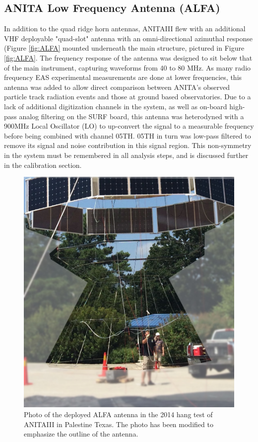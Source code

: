 	
	
	\subsection{ANITA Low Frequency Antenna (ALFA)}
		In addition to the quad ridge horn antennas, ANITAIII flew with an additional VHF deployable "quad-slot" antenna with an omni-directional azimuthal response (Figure \ref{fig:ALFA} mounted underneath the main structure, pictured in Figure \ref{fig:ALFA}.  The frequency response of the antenna was designed to sit below that of the main instrument, capturing waveforms from 40 to 80 MHz.  As many radio frequency EAS experimental measurements are done at lower frequencies, this antenna was added to allow direct comparison between ANITA's observed particle track radiation events and those at ground based observatories.  Due to a lack of additional digitization channels in the system, as well as on-board high-pass analog filtering on the SURF board, this antenna was heterodyned with a 900MHz Local Oscillator (LO) to up-convert the signal to a measurable frequency before being combined with channel 05TH.  05TH in turn was low-pass filtered to remove its signal and noise contribution in this signal region.  This non-symmetry in the system must be remembered in all analysis steps, and is discussed further in the calibration section.
		
\begin{figure}
\centering
	\includegraphics[width=\textwidth]{figures/ALFA_pic}
	\caption{Photo of the deployed ALFA antenna in the 2014 hang test of ANITAIII in Palestine Texas.  The photo has been modified to emphasize the outline of the antenna.}
	\label{fig:ALFA_pic}
\end{figure}


